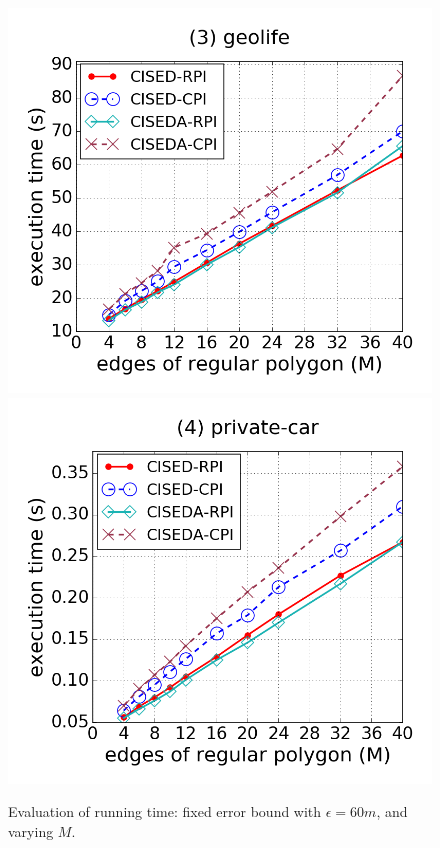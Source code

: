 \begin{figure}[tb!]
\includegraphics[scale = 0.250]{figures/Exp-M-e-60-time-geolife.png}
\includegraphics[scale = 0.250]{figures/Exp-M-e-60-time-private.png}
\vspace{-2ex}
\caption{\small Evaluation of running time: fixed error bound with $\epsilon=60m$, and varying $M$.}
\label{fig:m-time-e60}
\vspace{-2ex}
\end{figure}

